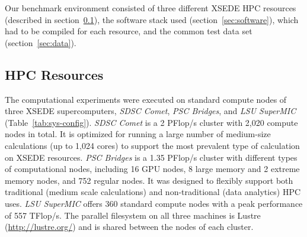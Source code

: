 \label{sec:system}
Our benchmark environment consisted of three different XSEDE \cite{xsede} HPC resources (described in section~\ref{sec:hpcresources}), the software stack used (section~\ref{sec:software}), which had to be compiled for each resource, and the common test data set (section~\ref{sec:data}).

\subsection{HPC Resources}
\label{sec:hpcresources}

The computational experiments were executed on standard compute nodes of three XSEDE \cite{xsede} supercomputers, \emph{SDSC Comet}, \emph{PSC Bridges}, and \emph{LSU SuperMIC} (Table~\ref{tab:sys-config}).
\emph{SDSC Comet} is a 2 PFlop/s cluster with 2,020 compute nodes in total. It is optimized for running a large number of medium-size calculations (up to 1,024 cores) to support the most prevalent type of calculation on XSEDE resources.
\emph{PSC Bridges} is a 1.35 PFlop/s cluster with different types of computational nodes, including 16 GPU nodes, 8 large memory and 2 extreme memory nodes, and 752 regular nodes.
It was designed to flexibly support both traditional (medium scale calculations) and non-traditional (data analytics) HPC uses.
\emph{LSU SuperMIC} offers 360 standard compute nodes with a peak performance of 557 TFlop/s.
The parallel filesystem on all three machines is Lustre (\url{http://lustre.org/}) and is shared between the nodes of each cluster.

